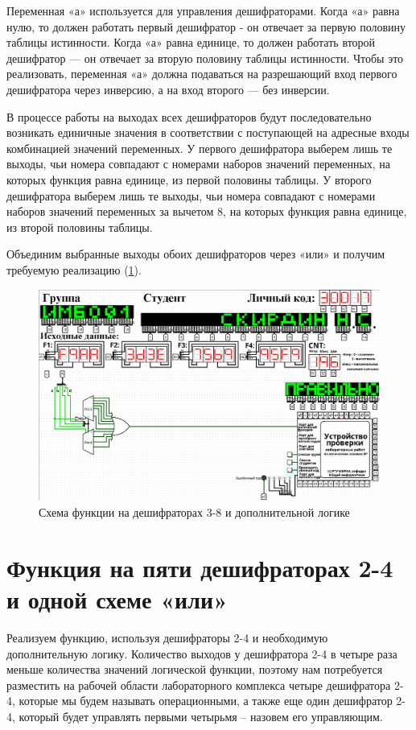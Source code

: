 \documentclass[14pt, a4paper]{extreport}
\begin{document}
Переменная «а» используется для управления дешифраторами. Когда «а» равна нулю, то должен работать первый дешифратор - он отвечает за первую половину таблицы истинности. Когда «а» равна единице, то должен работать второй дешифратор — он отвечает за вторую половину таблицы истинности. Чтобы это реализовать, переменная «а» должна подаваться на разрешающий вход первого дешифратора через инверсию, а на вход второго — без инверсии.

В процессе работы на выходах всех дешифраторов будут последовательно возникать единичные значения в соответствии с поступающей на адресные входы комбинацией значений переменных. У первого дешифратора выберем лишь те выходы, чьи номера совпадают с номерами наборов значений переменных, на которых функция равна единице, из первой половины таблицы. У второго дешифратора выберем лишь те выходы, чьи номера совпадают с номерами наборов значений переменных за вычетом 8, на которых функция равна единице, из второй половины таблицы.

Объединим выбранные выходы обоих дешифраторов через «или» и получим требуемую реализацию (\cref{fig:decoder-3-8}).
\begin{figure}[H]
	\caption{Схема функции на дешифраторах 3-8 и дополнительной логике}
	\label{fig:decoder-3-8}
	\includegraphics[width=\textwidth]{decoder-3-8}
\end{figure}

\section{Функция на пяти дешифраторах 2-4 и одной схеме «или»}
Реализуем функцию, используя дешифраторы 2-4 и необходимую дополнительную логику. Количество выходов у дешифратора 2-4 в четыре раза меньше количества значений логической функции, поэтому нам потребуется разместить на рабочей области лабораторного комплекса четыре дешифратора 2-4, которые мы будем называть операционными, а также еще один дешифратор 2-4, который будет управлять первыми четырьмя – назовем его управляющим.
\end{document}
